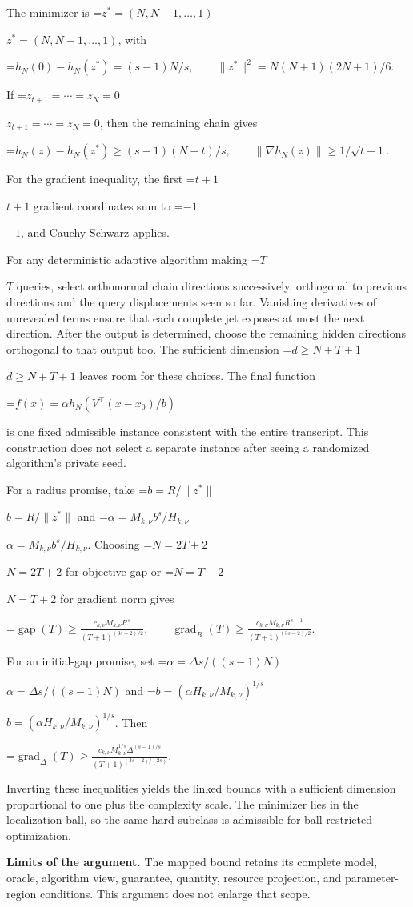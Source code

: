 \documentclass[10pt,a4paper]{article}
\newcommand{\AtlasMath}[1]{\par\begingroup\centering\setbox0=\hbox{$\displaystyle #1$}\ifdim\wd0>1.4\linewidth\typeout{ATLAS WIDE FORMULA: \the\wd0}\fi\ifdim\wd0>\linewidth\resizebox{\linewidth}{!}{\box0}\else\box0\fi\par\endgroup}
\newcommand{\AtlasInlineMath}[1]{\begingroup\setbox0=\hbox{$#1$}\ifdim\wd0>.4\linewidth\endgroup\AtlasMath{#1}\else\endgroup$#1$\fi}
\begin{document}
The minimizer is \AtlasInlineMath{z^*=(N,N-1,\ldots,1)}, with

\AtlasMath{h_N(0)-h_N(z^*)=(s-1)N/s,\qquad
\|z^*\|^2=N(N+1)(2N+1)/6.}

If \AtlasInlineMath{z_{t+1}=\cdots=z_N=0}, then the remaining chain gives

\AtlasMath{h_N(z)-h_N(z^*)\ge(s-1)(N-t)/s,\qquad
\|\nabla h_N(z)\|\ge1/\sqrt{t+1}.}

For the gradient inequality, the first \AtlasInlineMath{t+1} gradient coordinates sum to \AtlasInlineMath{-1}, and Cauchy-Schwarz applies.

For any deterministic adaptive algorithm making \AtlasInlineMath{T} queries, select orthonormal chain directions successively, orthogonal to previous directions and the query displacements seen so far. Vanishing derivatives of unrevealed terms ensure that each complete jet exposes at most the next direction. After the output is determined, choose the remaining hidden directions orthogonal to that output too. The sufficient dimension \AtlasInlineMath{d\ge N+T+1} leaves room for these choices. The final function

\AtlasMath{f(x)=\alpha h_N(V^\top(x-x_0)/b)}

is one fixed admissible instance consistent with the entire transcript. This construction does not select a separate instance after seeing a randomized algorithm's private seed.

For a radius promise, take \AtlasInlineMath{b=R/\|z^*\|} and \AtlasInlineMath{\alpha=M_{k,\nu}b^s/H_{k,\nu}}. Choosing \AtlasInlineMath{N=2T+2} for objective gap or \AtlasInlineMath{N=T+2} for gradient norm gives

\AtlasMath{\operatorname{gap}(T)\ge\frac{c_{k,\nu}M_{k,\nu}R^s}{(T+1)^{(3s-2)/2}},\qquad
\operatorname{grad}_R(T)\ge\frac{c_{k,\nu}M_{k,\nu}R^{s-1}}{(T+1)^{(3s-2)/2}}.}

For an initial-gap promise, set \AtlasInlineMath{\alpha=\Delta s/((s-1)N)} and \AtlasInlineMath{b=(\alpha H_{k,\nu}/M_{k,\nu})^{1/s}}. Then

\AtlasMath{\operatorname{grad}_\Delta(T)\ge\frac{c_{k,\nu}M_{k,\nu}^{1/s}\Delta^{(s-1)/s}}{(T+1)^{(3s-2)/(2s)}}.}

Inverting these inequalities yields the linked bounds with a sufficient dimension proportional to one plus the complexity scale. The minimizer lies in the localization ball, so the same hard subclass is admissible for ball-restricted optimization.

\textbf{Limits of the argument.} The mapped bound retains its complete model, oracle, algorithm view, guarantee, quantity, resource projection, and parameter-region conditions. This argument does not enlarge that scope.
\end{document}
